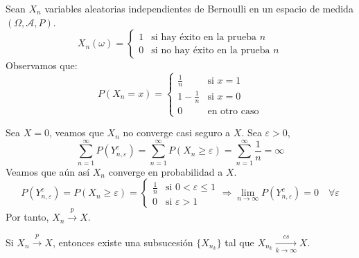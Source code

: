 \begin{example}
    Sean $X_n$ variables aleatorias independientes de Bernoulli en un espacio de medida $(\Omega, \mathcal{A}, P)$.
    $$X_n(\omega) = \begin{cases}
            1 & \text{si hay éxito en la prueba } n    \\
            0 & \text{si no hay éxito en la prueba } n
        \end{cases}$$
    Observamos que:
    $$P(X_n = x) = \begin{cases}
            \frac{1}{n}     & \text{si } x = 1    \\
            1 - \frac{1}{n} & \text{si } x = 0    \\
            0               & \text{en otro caso}
        \end{cases}$$

    Sea $X = 0$, veamos que $X_n$ no converge casi seguro a $X$.
    Sea $\varepsilon > 0$,
    $$\sum_{n=1}^\infty P(Y_{n, \varepsilon}^c) = \sum_{n=1}^\infty P(X_n \geq \varepsilon) = \sum_{n=1}^\infty \frac{1}{n} = \infty$$
    Veamos que aún así $X_n$ converge en probabilidad a $X$.
    $$P(Y_{n, \varepsilon}^c) = P(X_n \geq \varepsilon) = \begin{cases}
            \frac{1}{n} & \text{si } 0 < \varepsilon \leq 1 \\
            0           & \text{si } \varepsilon > 1
        \end{cases} \Rightarrow \lim\limits_{n \to \infty} P(Y_{n, \varepsilon}^c) = 0 \quad \forall \varepsilon$$
    Por tanto, $X_n \xrightarrow{p} X$.
\end{example}

\begin{theorem}
    Si $X_n \xrightarrow{p} X$, entonces existe una subsucesión $\{X_{n_k}\}$ tal que $X_{n_k} \xrightarrow[k \to \infty]{cs} X$.
\end{theorem}